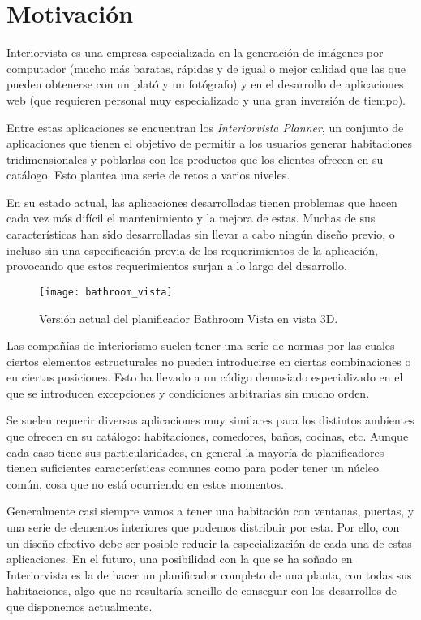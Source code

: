 \section{Motivación}
Interiorvista es una empresa especializada en la generación de imágenes por computador (mucho más baratas, rápidas y de igual o mejor calidad que las que pueden obtenerse con un plató y un fotógrafo) y en el desarrollo de aplicaciones web (que requieren personal muy especializado y una gran inversión de tiempo).

Entre estas aplicaciones se encuentran los \textit{Interiorvista Planner}, un conjunto de aplicaciones que tienen el objetivo de permitir a los usuarios generar habitaciones tridimensionales y poblarlas con los productos que los clientes ofrecen en su catálogo. Esto plantea una serie de retos a varios niveles.

En su estado actual, las aplicaciones desarrolladas tienen problemas que hacen cada vez más difícil el mantenimiento y la mejora de estas. Muchas de sus características han sido desarrolladas sin llevar a cabo ningún diseño previo, o incluso sin una especificación previa de los requerimientos de la aplicación, provocando que estos requerimientos surjan a lo largo del desarrollo.

\begin{figure}[H]
    \centering
    \texttt{[image: bathroom\_vista]}
    \caption{Versión actual del planificador Bathroom Vista en vista 3D.}
    \label{fig:bathroom_vista}
\end{figure}


Las compañías de interiorismo suelen tener una serie de normas por las cuales ciertos elementos estructurales no pueden introducirse en ciertas combinaciones o en ciertas posiciones. Esto ha llevado a un código demasiado especializado en el que se introducen excepciones y condiciones arbitrarias sin mucho orden.

Se suelen requerir diversas aplicaciones muy similares para los distintos ambientes que ofrecen en su catálogo: habitaciones, comedores, baños, cocinas, etc. Aunque cada caso tiene sus particularidades, en general la mayoría de planificadores tienen suficientes características comunes como para poder tener un núcleo común, cosa que no está ocurriendo en estos momentos.

Generalmente casi siempre vamos a tener una habitación con ventanas, puertas, y una serie de elementos interiores que podemos distribuir por esta. Por ello, con un diseño efectivo debe ser posible reducir la especialización de cada una de estas aplicaciones. En el futuro, una posibilidad con la que se ha soñado en Interiorvista es la de hacer un planificador completo de una planta, con todas sus habitaciones, algo que no resultaría sencillo de conseguir con los desarrollos de que disponemos actualmente.


